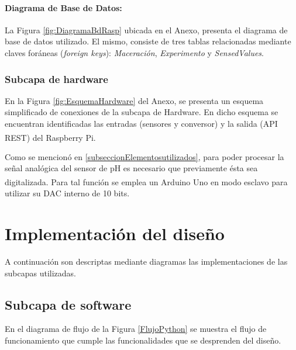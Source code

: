                 \paragraph{Diagrama de Base de Datos:} La Figura \ref{fig:DiagramaBdRasp} ubicada en el Anexo, presenta el diagrama de base de datos utilizado. El mismo, consiste de tres tablas relacionadas mediante claves foráneas (\textit{foreign keys}): \textit{Maceración}, \textit{Experimento} y \textit{SensedValues}. 
                
                
            \subsubsection{Subcapa de hardware} 
                \par En la Figura \ref{fig:EsquemaHardware} del Anexo, se presenta un esquema simplificado de conexiones de la subcapa de Hardware. En dicho esquema se encuentran identificadas las entradas (sensores y conversor) y la salida (API REST) del Raspberry\textsuperscript{\textregistered} Pi.
                
                \par Como se mencionó en \ref{subseccionElementosutilizados}, para poder procesar la señal analógica del sensor de pH es necesario que previamente ésta sea digitalizada. Para tal función se emplea un Arduino\textsuperscript{\textregistered} Uno en modo esclavo para utilizar su DAC interno de 10 bits.
        
    
\section{Implementación del diseño}
    \par A continuación son descriptas mediante diagramas las implementaciones de las subcapas utilizadas.
    \subsection{Subcapa de software}
        \par En el diagrama de flujo de la Figura \ref{FlujoPython} se muestra el flujo de funcionamiento que cumple las funcionalidades que se desprenden del diseño.


